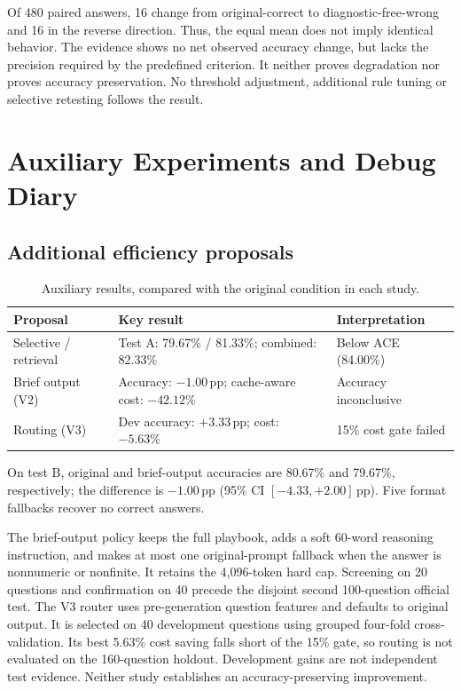 \documentclass[10pt,a4paper]{article}
\newcommand{\pp}{\,\mathrm{pp}}
\newcommand{\smalltable}{\small\setlength{\tabcolsep}{4pt}}
\begin{document}
Of 480 paired answers, 16 change from original-correct to diagnostic-free-wrong and 16 in the reverse direction. Thus, the equal mean does not imply identical behavior. The evidence shows no net observed accuracy change, but lacks the precision required by the predefined criterion. It neither proves degradation nor proves accuracy preservation. No threshold adjustment, additional rule tuning or selective retesting follows the result.

\clearpage
\section{Auxiliary Experiments and Debug Diary}
\subsection{Additional efficiency proposals}
\begin{table}[h!]
\centering\smalltable
\begin{tabularx}{\linewidth}{P{34mm}Y P{42mm}}
\toprule
Proposal & Key result & Interpretation \\
\midrule
Selective / retrieval & Test A: 79.67\% / 81.33\%; combined: 82.33\% & Below ACE (84.00\%) \\
Brief output (V2) & Accuracy: $-1.00\pp$; cache-aware cost: $-42.12\%$ & Accuracy inconclusive \\
Routing (V3) & Dev accuracy: $+3.33\pp$; cost: $-5.63\%$ & 15\% cost gate failed \\
\bottomrule
\end{tabularx}
\caption{Auxiliary results, compared with the original condition in each study.}
\end{table}
On test B, original and brief-output accuracies are 80.67\% and 79.67\%, respectively; the difference is $-1.00\pp$ (95\% CI $[-4.33,+2.00]\pp$). Five format fallbacks recover no correct answers.

The brief-output policy keeps the full playbook, adds a soft 60-word reasoning instruction, and makes at most one original-prompt fallback when the answer is nonnumeric or nonfinite. It retains the 4,096-token hard cap. Screening on 20 questions and confirmation on 40 precede the disjoint second 100-question official test. The V3 router uses pre-generation question features and defaults to original output. It is selected on 40 development questions using grouped four-fold cross-validation. Its best 5.63\% cost saving falls short of the 15\% gate, so routing is not evaluated on the 160-question holdout. Development gains are not independent test evidence. Neither study establishes an accuracy-preserving improvement.
\end{document}
